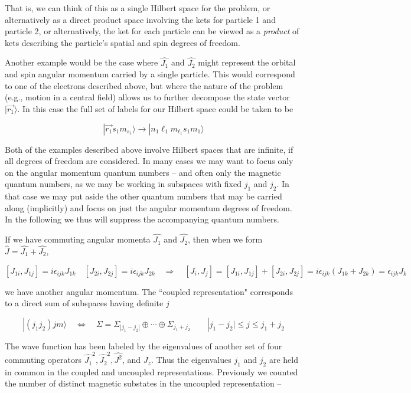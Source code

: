 That is, we can think of this as a single Hilbert space for the problem, or
alternatively as a direct product space involving the kets for particle 1 and
particle 2, or alternatively, the ket for each particle can be viewed as
a \textit{product} of kets describing the particle's spatial and spin degrees
of freedom. 

Another example would be the case where $\hat{J_1}$ and $\hat{J_2}$ might
represent the orbital and spin angular momentum carried by a single particle.
This would correspond to one of the electrons described above, but where the
nature of the problem (e.g., motion in a central field) allows us to further
decompose the state vector $|\vec{r_1}\rangle$. In this case the full set of
labels for our Hilbert space could be taken to be 

\[
  |\vec{r_1}s_1m_{s_1} \rangle \rightarrow | n_1\ell_1 m_{\ell_1} s_1m_1\rangle
\] \vspace{3px}


Both of the examples described above involve Hilbert spaces that are infinite,
if all degrees of freedom are considered.  In many cases we may want to focus only on the angular momentum
quantum numbers – and often only the magnetic quantum numbers, as we may be working in
subspaces with fixed $j_1$ and $j_2$. In that case we may put aside the other quantum numbers that
may be carried along (implicitly) and focus on just the angular momentum degrees of freedom. In
the following we thus will suppress the accompanying quantum numbers. 

If we have commuting angular momenta $\hat{J_1}$ and $\hat{J_2}$, then when we
form $\hat{J} = \hat{J_1} + \hat{J_2}$, 

\[
  [J_{1i}, J_{1j}] = i\epsilon_{ijk} J_{1k} \quad [J_{2i}, J_{2j}]
  = i\epsilon_{ijk} J_{2k} \quad \Rightarrow \quad [J_i, J_j] = [J_{1i},
  J_{1j}] + [J_{2i}, J_{2j}] = i\epsilon_{ijk} (J_{1k} + J_{2k})
  = \epsilon_{ijk} J_k
\] \vspace{3px}

we have another angular momentum. The ``coupled representation" corresponds to
a direct sum of subspaces having definite $j$

\[
  |(j_1j_2) jm \rangle \quad \Leftrightarrow \quad \Sigma = \Sigma_{|j_1
  - j_2|} \oplus \cdots \oplus \Sigma_{j_1+j_2} \qquad |j_1-j_2| \leq j \leq
  j_1 + j_2
\] \vspace{3px}


The wave function has been labeled by the eigenvalues of another set of four
commuting operators $\hat{J_1}^2,  \hat{J_2}^2, \hat{J^2}$, and $J_z$. Thus the
eigenvalues $j_1$ and $j_2$ are held in common in the coupled and uncoupled
representations. Previously we counted the number of distinct magnetic
substates in the uncoupled representation -- 

